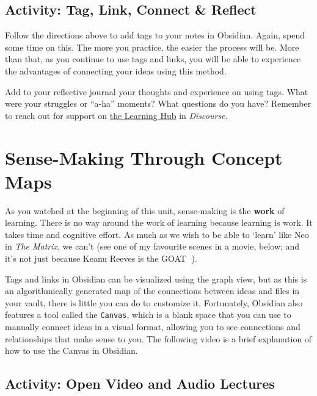 \documentclass[
]{book}
\theoremstyle{definition}
\theoremstyle{definition}
\theoremstyle{definition}
\theoremstyle{definition}
\theoremstyle{remark}
\begin{document}
\hypertarget{activity-tag-link-connect-reflect}{%
\subsection*{Activity: Tag, Link, Connect \& Reflect}\label{activity-tag-link-connect-reflect}}

\begin{reflect}
Follow the directions above to add tags to your notes in Obsidian. Again, spend some time on this. The more you practice, the easier the process will be. More than that, as you continue to use tags and links, you will be able to experience the advantages of connecting your ideas using this method.

Add to your reflective journal your thoughts and experience on using tags. What were your struggles or ``a-ha'' moments? What questions do you have? Remember to reach out for support on \href{https://twu.discourse.group}{the Learning Hub} in \emph{Discourse}.
\end{reflect}

\hypertarget{sense-making-through-concept-maps}{%
\section*{Sense-Making Through Concept Maps}\label{sense-making-through-concept-maps}}

As you watched at the beginning of this unit, sense-making is the \textbf{work} of learning. There is no way around the work of learning because learning is work. It takes time and cognitive effort. As much as we wish to be able to `learn' like Neo in \emph{The Matrix}, we can't (see one of my favourite scenes in a movie, below; and it's not just because Keanu Reeves is the GOAT 🐐).

Tags and links in Obsidian can be visualized using the graph view, but as this is an algorithmically generated map of the connections between ideas and files in your vault, there is little you can do to customize it. Fortunately, Obsidian also features a tool called the \texttt{Canvas}, which is a blank space that you can use to manually connect ideas in a visual format, allowing you to see connections and relationships that make sense to you. The following video is a brief explanation of how to use the Canvas in Obsidian.

\hypertarget{activity-open-video-and-audio-lectures}{%
\subsection*{Activity: Open Video and Audio Lectures}\label{activity-open-video-and-audio-lectures}}
\end{document}
